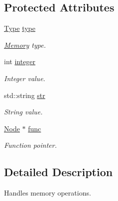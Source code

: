 \subsection*{Protected Attributes}
\begin{DoxyCompactItemize}
\item 
\hypertarget{classMemory_a918d8160ac6fefa393ab29a11da83e6e}{}\hyperlink{classMemory_a9193c3e610b1728964440284db90c812}{Type} \hyperlink{classMemory_a918d8160ac6fefa393ab29a11da83e6e}{type}\label{classMemory_a918d8160ac6fefa393ab29a11da83e6e}

\begin{DoxyCompactList}\small\item\em \hyperlink{classMemory}{Memory} type. \end{DoxyCompactList}\item 
\hypertarget{classMemory_ac80bb688056b1ea413f35e6395e7c590}{}int \hyperlink{classMemory_ac80bb688056b1ea413f35e6395e7c590}{integer}\label{classMemory_ac80bb688056b1ea413f35e6395e7c590}

\begin{DoxyCompactList}\small\item\em Integer value. \end{DoxyCompactList}\item 
\hypertarget{classMemory_a96bb9384b8d7a57c75af4f1345279cc4}{}std\+::string \hyperlink{classMemory_a96bb9384b8d7a57c75af4f1345279cc4}{str}\label{classMemory_a96bb9384b8d7a57c75af4f1345279cc4}

\begin{DoxyCompactList}\small\item\em String value. \end{DoxyCompactList}\item 
\hypertarget{classMemory_ae8c01f737989b477cf085612795ed13b}{}\hyperlink{classNode}{Node} $\ast$ \hyperlink{classMemory_ae8c01f737989b477cf085612795ed13b}{func}\label{classMemory_ae8c01f737989b477cf085612795ed13b}

\begin{DoxyCompactList}\small\item\em Function pointer. \end{DoxyCompactList}\end{DoxyCompactItemize}


\subsection{Detailed Description}
Handles memory operations. 

